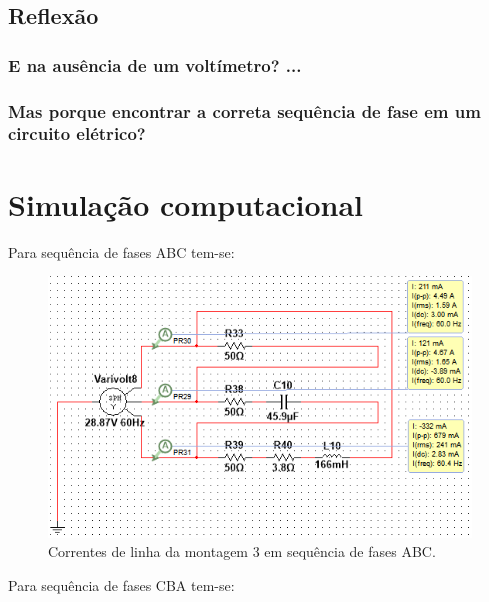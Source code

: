 \documentclass[a4paper,12pt,oneside,openany,table,xcdraw]{article}
\begin{document}
\vspace{0.2cm}

\subsection{Reflexão}
\subsubsection{E na ausência de um voltímetro? ...}
 

\subsubsection{Mas porque encontrar a correta sequência de fase em um circuito elétrico? }



\newpage
\section{Simulação computacional} %
Para sequência de fases ABC tem-se: 

\begin{figure}[H]
\centering
\includegraphics[width=13.5cm]{m3-esquema-abc-correntes}
\caption{Correntes de linha da montagem 3 em sequência de fases ABC.}
\label{m2:IL}
\end{figure}

\vspace{0.3cm}
Para sequência de fases CBA tem-se: 
\end{document}
